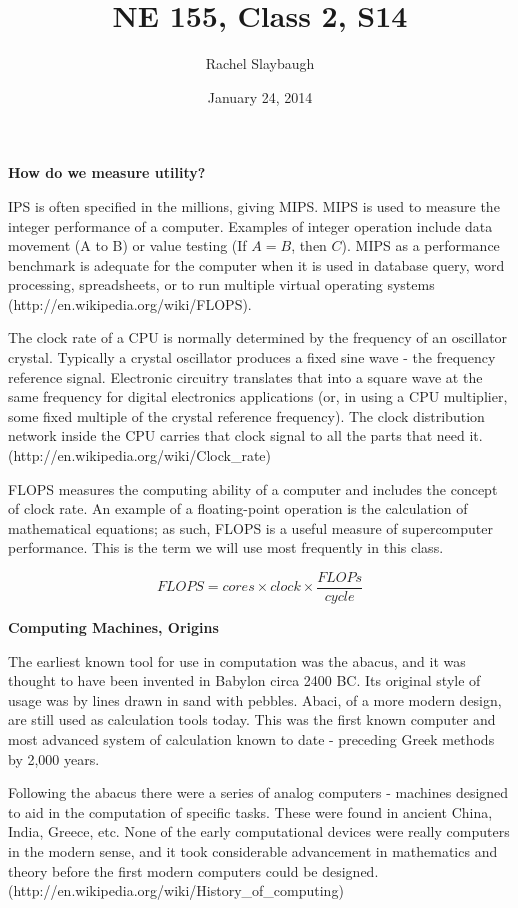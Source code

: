 \documentclass[12pt, ]{article}
\title{NE 155, Class 2, S14}
\author{Rachel Slaybaugh}
\date{January 24, 2014}
\begin{document}
\maketitle

\noindent \textbf{How do we measure utility?}

IPS is often specified in the millions, giving MIPS. MIPS is used to measure the integer performance of a computer. Examples of integer operation include data movement (A to B) or value testing (If $A = B$, then $C$). MIPS as a performance benchmark is adequate for the computer when it is used in database query, word processing, spreadsheets, or to run multiple virtual operating systems (http://en.wikipedia.org/wiki/FLOPS).

The clock rate of a CPU is normally determined by the frequency of an oscillator crystal. Typically a crystal oscillator produces a fixed sine wave - the frequency reference signal. Electronic circuitry translates that into a square wave at the same frequency for digital electronics applications (or, in using a CPU multiplier, some fixed multiple of the crystal reference frequency). The clock distribution network inside the CPU carries that clock signal to all the parts that need it. (http://en.wikipedia.org/wiki/Clock\_rate)

FLOPS measures the computing ability of a computer and includes the concept of clock rate. An example of a floating-point operation is the calculation of mathematical equations; as such, FLOPS is a useful measure of supercomputer performance. This is the term we will use most frequently in this class. 

\begin{equation}
FLOPS = cores \times clock \times \frac{FLOPs}{cycle} \nonumber
\end{equation}

\vspace*{2em}
\noindent \textbf{Computing Machines, Origins}

The earliest known tool for use in computation was the abacus, and it was thought to have been invented in Babylon circa 2400 BC. Its original style of usage was by lines drawn in sand with pebbles. Abaci, of a more modern design, are still used as calculation tools today. This was the first known computer and most advanced system of calculation known to date - preceding Greek methods by 2,000 years. 

Following the abacus there were a series of analog computers - machines designed to aid in the computation of specific tasks. These were found in ancient China, India, Greece, etc. None of the early computational devices were really computers in the modern sense, and it took considerable advancement in mathematics and theory before the first modern computers could be designed. (http://en.wikipedia.org/wiki/History\_of\_computing)
\end{document}

